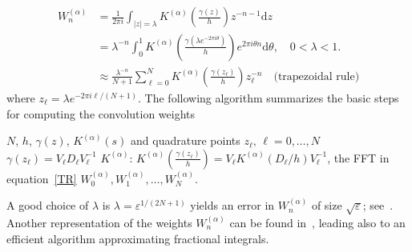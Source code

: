 \documentclass[a4paper,10pt,reqno]{amsart}
\theoremstyle{definition}
\newcommand{\dd}{\mathrm{d}}
\begin{document}
\begin{align}
    W_n^{(\alpha)} &=\frac{1}{2\pi i}\int_{|z|=\lambda}K^{(\alpha)}\left(\frac{\gamma(z)}{h}\right)z ^{-n-1} \dd z\nonumber\\
 &=\lambda^{-n}\int_{0}^1 K^{(\alpha)}\left(\frac{\gamma(\lambda e^{-2\pi i \theta})}{h}\right)e ^{2\pi i \theta n} \dd \theta,\quad 0<\lambda<1.\nonumber\\
 &\approx \frac{\lambda^{-n}}{N+1}\sum_{\ell=0}^N K^{(\alpha)}\left(\frac{\gamma(z_\ell)}{h}\right)z_\ell^{-n}
\quad \text{(trapezoidal rule)}\label{TR}
\end{align}
where $z_\ell=\lambda e^{-2\pi i\ell/(N+1)}$. The  following  algorithm  summarizes  the  basic  steps  for  computing the convolution weights
\begin{algorithm}{}
\begin{algorithmic}[1]
 $N$, $h$, $\gamma(z)$, $K^{(\alpha)}(s)$ and quadrature points $z_\ell,\, \ell =0,\ldots,N$
 $\gamma(z_\ell)=V_\ell D_\ell V_\ell^{-1}$
 $K^{(\alpha)}$: $K^{(\alpha)}\left(\frac{\gamma(z_\ell)}{h}\right)=V_\ell K^{(\alpha)}(D_\ell/h) V_\ell^{-1}$,
 the FFT in equation~\eqref{TR}
\EndFor
{} $W_0^{(\alpha)},W_1^{(\alpha)},\ldots,  W_N^{(\alpha)}.$
\end{algorithmic}
\caption{Basic algorithm to compute the convolution weights}\label{alg:Fractional_weights_Algorithm}
\end{algorithm}

A good choice of $\lambda$ is $\lambda=\varepsilon^{1/(2N+1)}$ yields an error in $W_n^{(\alpha)}$ of size $\sqrt{\varepsilon}$; see~\cite{Lubich2}. Another representation of the weights $W_n^{(\alpha)}$  can be found in~\cite{BaLo}, leading also to an efficient algorithm approximating fractional integrals.
\end{document}
